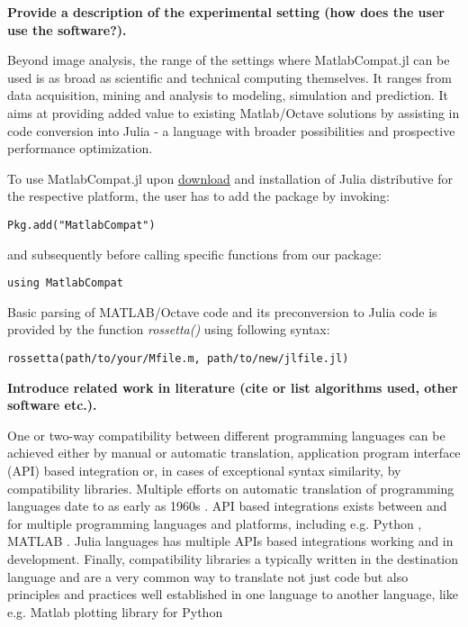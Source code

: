 \textbf{Provide a description of the experimental setting (how does the user use the software?).}

Beyond image analysis, the range of the settings where MatlabCompat.jl can be used is as broad as scientific and technical computing themselves. It ranges from data acquisition, mining and analysis to modeling, simulation and prediction. It aims at providing added value to existing Matlab/Octave solutions by assisting in code conversion into Julia - a language with broader possibilities and prospective performance optimization.

To use MatlabCompat.jl upon \href{http://julialang.org/downloads/}{download} and installation of Julia distributive for the respective platform, the user has to add the package by invoking:

\verb|Pkg.add("MatlabCompat")|

and subsequently before calling specific functions from our package:

\verb|using MatlabCompat|

Basic parsing of MATLAB/Octave code and its preconversion to Julia code is provided by the function \textit{rossetta()} using following syntax:

\verb|rossetta(path/to/your/Mfile.m, path/to/new/jlfile.jl)|

\textbf{Introduce related work in literature (cite or list algorithms used, other software etc.).}

One or two-way compatibility between different programming languages can be achieved either by manual or automatic translation, application program interface (API) based integration or, in cases of exceptional syntax similarity, by compatibility libraries. Multiple efforts on automatic translation of programming languages date to as early as 1960s \cite{Ledley_1962, irons1961syntax}. API based integrations exists between and for multiple programming languages and platforms, including e.g. Python \cite{autin2012upy}, MATLAB \cite{Bornstein_2008}. Julia languages has multiple APIs based integrations working and in development. Finally, compatibility libraries a typically written in the destination language and are a very common way to translate not just code but also principles and practices well established in one language to another language, like e.g. Matlab plotting library for Python \cite{Hunter_2007, barrett2005matplotlib}
    
    
    
    
    
    
    
    
    
    
    
    
    
    
    
    
    
  
  
  
  
  
  